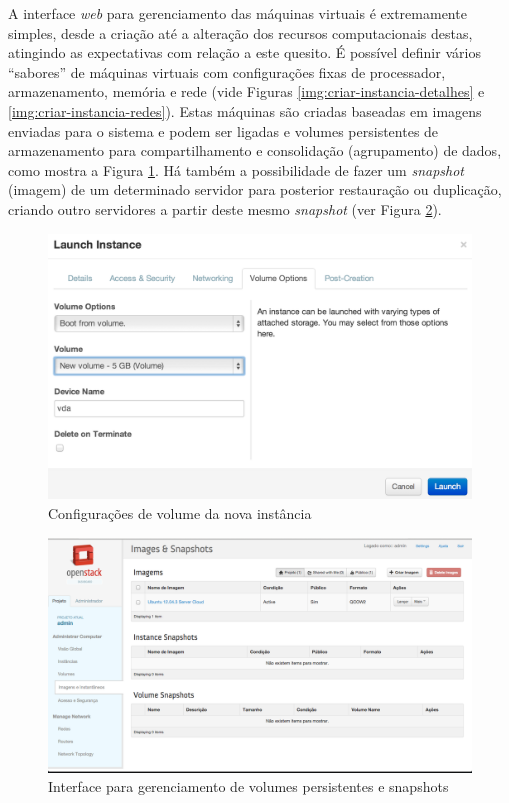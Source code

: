 A interface \emph{web} para gerenciamento das máquinas virtuais é extremamente simples,
desde a criação até a alteração dos recursos computacionais destas, atingindo
as expectativas com relação a este quesito. É possível definir vários ``sabores'' de máquinas
virtuais com configurações fixas de processador, armazenamento, memória e rede
(vide Figuras \ref{img:criar-instancia-detalhes} e \ref{img:criar-instancia-redes}).
Estas máquinas são criadas baseadas em imagens enviadas para o sistema e podem
ser ligadas e volumes persistentes de armazenamento para compartilhamento e
consolidação (agrupamento) de dados, como mostra a Figura \ref{img:criar-instancia-volume-site}.
Há também a  possibilidade de fazer um \emph{snapshot} (imagem) de um determinado servidor
para posterior restauração ou duplicação, criando outro servidores a partir deste
mesmo \emph{snapshot} (ver Figura \ref{img:imagens-e-snapshots}).

\begin{figure}[h]
  \center
  \includegraphics[scale=0.50]{imagem/criar-instancia-volume-site.png}
  \caption{Configurações de volume da nova instância}
  \label{img:criar-instancia-volume-site}
\end{figure}

\begin{figure}[h]
  \center
  \includegraphics[scale=0.3]{imagem/imagens-e-snapshots.png}
  \caption{Interface para gerenciamento de volumes persistentes e snapshots}
  \label{img:imagens-e-snapshots}
\end{figure}

